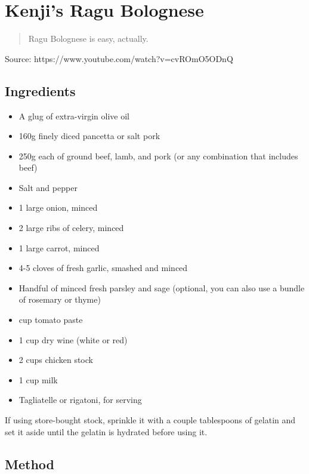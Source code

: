 \clearpage
\section{Kenji's Ragu Bolognese}


\begin{quote}
    Ragu Bolognese is easy, actually.
\end{quote}

Source: https://www.youtube.com/watch?v=cvROmO5ODnQ

\subsection{Ingredients}

\begin{itemize}
    \item A glug of extra-virgin olive oil
    \item 160g finely diced pancetta or salt pork
    \item 250g each of ground beef, lamb, and pork (or any combination that includes beef)
    \item Salt and pepper
    \item 1 large onion, minced
    \item 2 large ribs of celery, minced
    \item 1 large carrot, minced
    \item 4-5 cloves of fresh garlic, smashed and minced
    \item Handful of minced fresh parsley and sage (optional, you can also use a bundle of rosemary or thyme)
    \item {} cup tomato paste
    \item 1 cup dry wine (white or red)
    \item 2 cups chicken stock
    \item 1 cup milk
    \item Tagliatelle or rigatoni, for serving
\end{itemize}
    
If using store-bought stock, sprinkle it with a couple tablespoons of gelatin and set it aside until the gelatin is hydrated before using it.

\subsection{Method}

